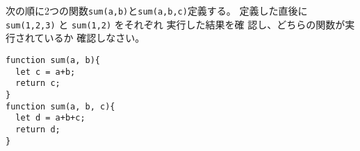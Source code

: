 \begin{Prob}\upshape
 次の順に2つの関数\texttt{sum(a,b)}と\texttt{sum(a,b,c)}定義する。
 定義した直後に \Verb+sum(1,2,3)+ と \Verb+sum(1,2)+ をそれぞれ
 実行した結果を確
 認し、どちらの関数が実行されているか 確認しなさい。
\begin{Verbatim}
function sum(a, b){
  let c = a+b;
  return c;
}
function sum(a, b, c){
  let d = a+b+c;
  return d;
}
\end{Verbatim}
\end{Prob}
